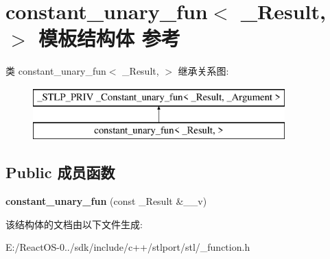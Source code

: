 \hypertarget{structconstant__unary__fun}{}\section{constant\+\_\+unary\+\_\+fun$<$ \+\_\+\+Result, $>$ 模板结构体 参考}
\label{structconstant__unary__fun}
类 constant\+\_\+unary\+\_\+fun$<$ \+\_\+\+Result, $>$ 继承关系图\+:\begin{figure}[H]
\begin{center}
\leavevmode
\includegraphics[height=2.000000cm]{structconstant__unary__fun}
\end{center}
\end{figure}
\subsection*{Public 成员函数}
\begin{DoxyCompactItemize}
\item 
\mbox{\label{structconstant__unary__fun_a350598718a6bea9b9aa80108b4bcd001}} 
{\bfseries constant\+\_\+unary\+\_\+fun} (const \+\_\+\+Result \&\+\_\+\+\_\+v)
\end{DoxyCompactItemize}


该结构体的文档由以下文件生成\+:\begin{DoxyCompactItemize}
\item 
E\+:/\+React\+O\+S-\/0../sdk/include/c++/stlport/stl/\+\_\+function.\+h\end{DoxyCompactItemize}
